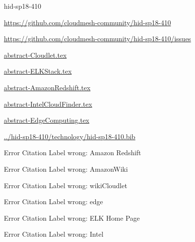 \begin{IU}

hid-sp18-410

\url{https://github.com/cloudmesh-community/hid-sp18-410}

\url{https://github.com/cloudmesh-community/hid-sp18-410/issues}

\href{https://github.com/cloudmesh-community/hid-sp18-410/blob/master//technology/abstract-Cloudlet.tex}{abstract-Cloudlet.tex}

\href{https://github.com/cloudmesh-community/hid-sp18-410/blob/master//technology/abstract-ELKStack.tex}{abstract-ELKStack.tex}

\href{https://github.com/cloudmesh-community/hid-sp18-410/blob/master//technology/abstract-AmazonRedshift.tex}{abstract-AmazonRedshift.tex}

\href{https://github.com/cloudmesh-community/hid-sp18-410/blob/master//technology/abstract-IntelCloudFinder.tex}{abstract-IntelCloudFinder.tex}

\href{https://github.com/cloudmesh-community/hid-sp18-410/blob/master//technology/abstract-EdgeComputing.tex}{abstract-EdgeComputing.tex}

\href{https://github.com/cloudmesh-community/hid-sp18-410/blob/master//technology/hid-sp18-410.bib}{../hid-sp18-410/technology/hid-sp18-410.bib}

 Error Citation Label wrong: Amazon Redshift

 Error Citation Label wrong: AmazonWiki

 Error Citation Label wrong: wikiCloudlet

 Error Citation Label wrong: edge

 Error Citation Label wrong: ELK Home Page

 Error Citation Label wrong: Intel

\end{IU}


